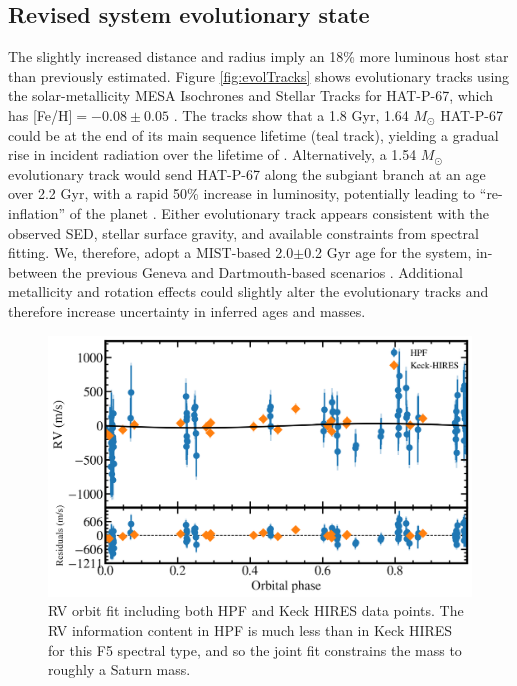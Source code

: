 \documentclass[linenumbers, twocolumn, trackchanges]{aastex631}
\newcommand{\hatpb}{\object{HAT-P-67 b}}
\begin{document}
\subsection{Revised system evolutionary state}\label{secMISTtracks}
The slightly increased distance and radius imply an 18\% more luminous host star than previously estimated.  Figure \ref{fig:evolTracks} shows evolutionary tracks using the solar-metallicity MESA \citep{2011ApJS..192....3P,2013ApJS..208....4P,2015ApJS..220...15P} Isochrones and Stellar Tracks \citep[MIST;][]{2016ApJS..222....8D,2016ApJ...823..102C} for HAT-P-67, which has [Fe/H]$=-0.08\pm0.05$ \citep{2017AJ....153..211Z}.  The tracks show that a 1.8 Gyr, 1.64 $M_\odot$ HAT-P-67 could be at the end of its main sequence lifetime (teal track), yielding a gradual rise in incident radiation over the lifetime of \hatpb.  Alternatively, a 1.54 $M_\odot$ evolutionary track would send HAT-P-67 along the subgiant branch at an age over 2.2 Gyr, with a rapid 50\% increase in luminosity, potentially leading to ``re-inflation'' of the planet \citep{2021ApJ...909L..16T}.  Either evolutionary track appears consistent with the observed SED, stellar surface gravity, and available constraints from spectral fitting.  We, therefore, adopt a MIST-based 2.0$\pm$0.2 Gyr age for the system, in-between the previous Geneva and Dartmouth-based scenarios \citep{2017AJ....153..211Z}.  Additional metallicity and rotation effects could slightly alter the evolutionary tracks and therefore increase uncertainty in inferred ages and masses.


\begin{figure}
  \includegraphics[width=\linewidth]{HAT-P-67b_rv.pdf}
  \caption{RV orbit fit including both HPF and Keck HIRES data points.  The RV information content in HPF is much less than in Keck HIRES for this F5 spectral type, and so the joint fit constrains the mass to roughly a Saturn mass.}
  \label{fig:RVfit}
\end{figure}
\end{document}
